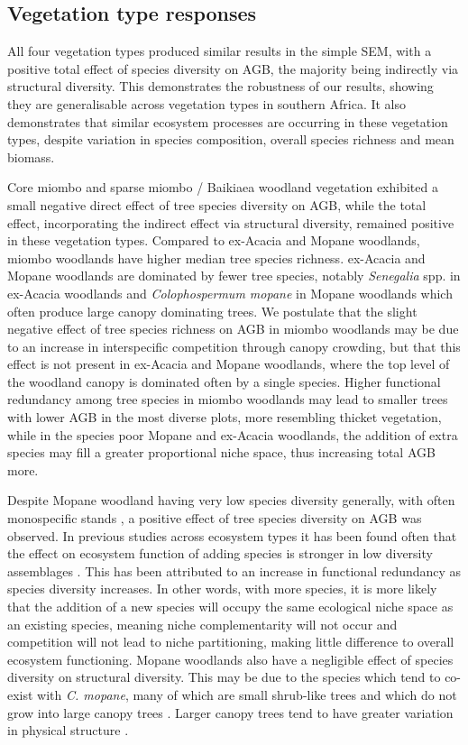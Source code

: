 \documentclass[11pt,a4paper]{article}
\begin{document}
\subsection{Vegetation type responses}

All four vegetation types produced similar results in the simple SEM, with a positive total effect of species diversity on AGB, the majority being indirectly via structural diversity. This demonstrates the robustness of our results, showing they are generalisable across vegetation types in southern Africa. It also demonstrates that similar ecosystem processes are occurring in these vegetation types, despite variation in species composition, overall species richness and mean biomass.

Core miombo and sparse miombo / Baikiaea woodland vegetation exhibited a small negative direct effect of tree species diversity on AGB, while the total effect, incorporating the indirect effect via structural diversity, remained positive in these vegetation types. Compared to ex-Acacia and Mopane woodlands, miombo woodlands have higher median tree species richness. ex-Acacia and Mopane woodlands are dominated by fewer tree species, notably \textit{Senegalia} spp. in ex-Acacia woodlands and \textit{Colophospermum mopane} in Mopane woodlands which often produce large canopy dominating trees. We postulate that the slight negative effect of tree species richness on AGB in miombo woodlands may be due to an increase in interspecific competition through canopy crowding, but that this effect is not present in ex-Acacia and Mopane woodlands, where the top level of the woodland canopy is dominated often by a single species. Higher functional redundancy among tree species in miombo woodlands may lead to smaller trees with lower AGB in the most diverse plots, more resembling thicket vegetation, while in the species poor Mopane and ex-Acacia woodlands, the addition of extra species may fill a greater proportional niche space, thus increasing total AGB more. 

Despite Mopane woodland having very low species diversity generally, with often monospecific stands \citep{Timberlake2010}, a positive effect of tree species diversity on AGB was observed. In previous studies across ecosystem types it has been found often that the effect on ecosystem function of adding species is stronger in low diversity assemblages \citep{Hector2007}. This has been attributed to an increase in functional redundancy as species diversity increases. In other words, with more species, it is more likely that the addition of a new species will occupy the same ecological niche space as an existing species, meaning niche complementarity will not occur and competition will not lead to niche partitioning, making little difference to overall ecosystem functioning. Mopane woodlands also have a negligible effect of species diversity on structural diversity. This may be due to the species which tend to co-exist with \textit{C. mopane}, many of which are small shrub-like trees and which do not grow into large canopy trees \citep{Timberlake2010}. Larger canopy trees tend to have greater variation in physical structure \citep{Seidel2019}. 
\end{document}
